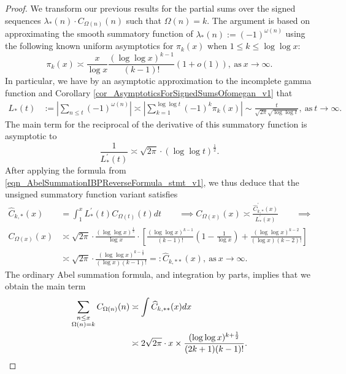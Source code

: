 \documentclass[11pt,reqno,a4letter]{article}
\numberwithin{figure}{section}
\numberwithin{table}{section}
\theoremstyle{plain}
\numberwithin{theorem}{section}
\theoremstyle{definition}
\begin{document}
\begin{proof}
We transform our previous results for the partial sums over the signed sequences 
$\lambda_{\ast}(n) \cdot C_{\Omega(n)}(n)$ such that $\Omega(n) = k$. 
The argument is based on approximating the smooth summatory function of 
$\lambda_{\ast}(n) := (-1)^{\omega(n)}$ using the following 
known uniform asymptotics for $\pi_k(x)$ when $1 \leq k \leq \log\log x$: 
\[
\pi_k(x) \asymp \frac{x}{\log x} \frac{(\log\log x)^{k-1}}{(k-1)!} (1 + o(1)), 
     \mathrm{\ as\ } x \rightarrow \infty. 
\]
In particular, we have by an asymptotic approximation to the incomplete gamma function and 
Corollary \ref{cor_AsymptoticsForSignedSumsOfomegan_v1} that 
\begin{align*} 
L_{\ast}(t) & := \left\lvert \sum_{n \leq t} (-1)^{\omega(n)} \right\rvert \asymp 
     \left\lvert \sum_{k=1}^{\log\log t} (-1)^{k} \pi_k(x) \right\rvert \sim 
     \frac{t}{\sqrt{2\pi} \sqrt{\log\log t}}, \mathrm{\ as\ } t \rightarrow \infty. 
\end{align*} 
The main term for the reciprocal of the derivative of this summatory function is 
asymptotic to
\[
\frac{1}{L_{\ast}^{\prime}(t)} \asymp \sqrt{2\pi} \cdot (\log\log t)^{\frac{1}{2}}. 
\]
After applying the formula from \eqref{eqn_AbelSummationIBPReverseFormula_stmt_v1},  
we thus deduce that the unsigned summatory function variant satisfies 
\begin{align*} 
\widehat{C}_{k,\ast}(x) & = \int_1^{x} L_{\ast}^{\prime}(t) C_{\Omega(t)}(t) dt \qquad \implies 
C_{\Omega(x)}(x) \asymp \frac{\widehat{C}_{k,\ast}^{\prime}(x)}{L_{\ast}^{\prime}(x)} \qquad \implies \\ 
C_{\Omega(x)}(x) & \asymp \sqrt{2\pi} \cdot \frac{(\log\log x)^{\frac{1}{2}}}{\log x} \cdot  
     \left[\frac{(\log\log x)^{k-1}}{(k-1)!} \left(1 - 
     \frac{1}{\log x}\right) + \frac{(\log\log x)^{k-2}}{(\log x) (k-2)!}\right] \\ 
     & \asymp \sqrt{2\pi} \cdot \frac{(\log\log x)^{k-\frac{1}{2}}}{(\log x) (k-1)!} 
     =: \widehat{C}_{k,\ast\ast}(x), \mathrm{\ as\ } x \rightarrow \infty. 
\end{align*} 
The ordinary Abel summation formula, and integration by parts, implies that we obtain the 
main term  
\begin{align*} 
\sum_{\substack{n \leq x \\ \Omega(n)=k}} C_{\Omega(n)}(n) & \asymp 
     \int \widehat{C}_{k,\ast\ast}(x)dx \\ 
     & \asymp 2\sqrt{2\pi} \cdot x \times 
     \frac{(\log\log x)^{k+\frac{1}{2}}}{(2k+1)(k-1)!}. 
     \qedhere 
\end{align*} 
\end{proof}
\end{document}
